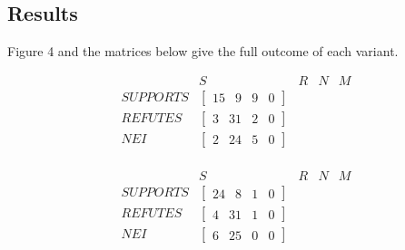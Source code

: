 \documentclass[11pt,a4paper]{article}
\begin{document}
\subsection{Results}

Figure 4 and the matrices below give the full outcome of each variant.

\begin{table}[t]
\centering
\[\begin{array}{lcccc}
 & \mathit{S} & \mathit{R} & \mathit{N} & \mathit{M} \\
\mathit{SUPPORTS} & \left[\begin{matrix} 15 & 9 & 9 & 0 \end{matrix}\right] \\
\mathit{REFUTES} & \left[\begin{matrix} 3 & 31 & 2 & 0 \end{matrix}\right] \\
\mathit{NEI} & \left[\begin{matrix} 2 & 24 & 5 & 0 \end{matrix}\right] \\
\end{array}\]
\caption{Confusion matrix $M$, pooled score with OpenAlex (baseline).}
\end{table}

\begin{table}[t]
\centering
\[\begin{array}{lcccc}
 & \mathit{S} & \mathit{R} & \mathit{N} & \mathit{M} \\
\mathit{SUPPORTS} & \left[\begin{matrix} 24 & 8 & 1 & 0 \end{matrix}\right] \\
\mathit{REFUTES} & \left[\begin{matrix} 4 & 31 & 1 & 0 \end{matrix}\right] \\
\mathit{NEI} & \left[\begin{matrix} 6 & 25 & 0 & 0 \end{matrix}\right] \\
\end{array}\]
\caption{Confusion matrix $M$, pooled score with Wikipedia.}
\end{table}
\end{document}
